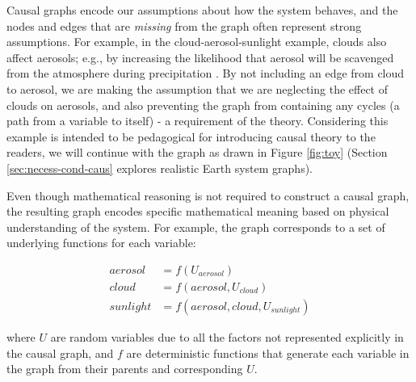 \documentclass[12pt]{article}
\begin{document}
Causal graphs encode our assumptions about how the system behaves, and
the nodes and edges that are \textit{missing} from the graph often
represent strong assumptions. For example, in the
cloud-aerosol-sunlight example, clouds also affect aerosols; e.g., by
increasing the likelihood that aerosol will be scavenged from the
atmosphere during precipitation \citep[e.g.,][]{radke-scavenge-1980,
  jurado2008, blanco-alegre2018}. By not including an edge from cloud
to aerosol, we are making the assumption that we are neglecting the
effect of clouds on aerosols, and also preventing the graph from
containing any cycles (a path from a variable to itself) - a
requirement of the theory. Considering this example is intended to be
pedagogical for introducing causal theory to the readers, we will
continue with the graph as drawn in Figure \ref{fig:toy} (Section
\ref{sec:necess-cond-caus} explores realistic Earth system graphs).

Even though mathematical reasoning is not required to construct a
causal graph, the resulting graph encodes specific mathematical
meaning based on physical understanding of the system. For example,
the graph corresponds to a set of underlying functions for each
variable:

\begin{align}
  \label{eq:2}
  aerosol &= f(U_{aerosol}) \\
  cloud &= f(aerosol, U_{cloud})\\
  sunlight &= f(aerosol, cloud, U_{sunlight})
\end{align}

where $U$ are random variables due to all the factors not represented
explicitly in the causal graph, and $f$ are deterministic functions
that generate each variable in the graph from their parents and
corresponding $U$.
\end{document}
